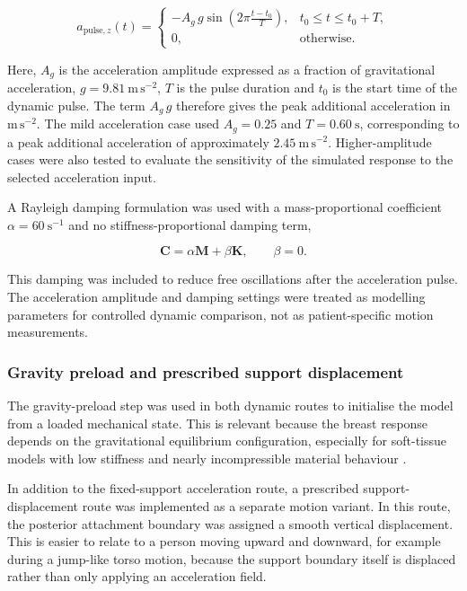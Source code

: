 \begin{equation}
a_{\mathrm{pulse},z}(t)
=
\begin{cases}
-A_{g}\,g\sin\left(2\pi\frac{t-t_{0}}{T}\right), & t_{0} \leq t \leq t_{0}+T, \\
0, & \mathrm{otherwise}.
\end{cases}
\label{fixed_support_acceleration_pulse}
\end{equation}

Here, $A_{g}$ is the acceleration amplitude expressed as a fraction of gravitational acceleration, $g=9.81~\mathrm{m\,s^{-2}}$, $T$ is the pulse duration and $t_{0}$ is the start time of the dynamic pulse. The term $A_{g}\,g$ therefore gives the peak additional acceleration in $\mathrm{m\,s^{-2}}$. The mild acceleration case used $A_{g}=0.25$ and $T=0.60~\mathrm{s}$, corresponding to a peak additional acceleration of approximately $2.45~\mathrm{m\,s^{-2}}$. Higher-amplitude cases were also tested to evaluate the sensitivity of the simulated response to the selected acceleration input.

A Rayleigh damping formulation was used with a mass-proportional coefficient $\alpha=60~\mathrm{s^{-1}}$ and no stiffness-proportional damping term,

\begin{equation}
\mathbf{C}
=
\alpha\mathbf{M}
+
\beta\mathbf{K},
\qquad
\beta=0.
\label{rayleigh_damping_definition}
\end{equation}

This damping was included to reduce free oscillations after the acceleration pulse. The acceleration amplitude and damping settings were treated as modelling parameters for controlled dynamic comparison, not as patient-specific motion measurements.

\subsubsection{Gravity preload and prescribed support displacement}
\label{gravity_preload_and_prescribed_support_displacement}

The gravity-preload step was used in both dynamic routes to initialise the model from a loaded mechanical state. This is relevant because the breast response depends on the gravitational equilibrium configuration, especially for soft-tissue models with low stiffness and nearly incompressible material behaviour \cite{Teixeira2023,Mazier2024}.

In addition to the fixed-support acceleration route, a prescribed support-displacement route was implemented as a separate motion variant. In this route, the posterior attachment boundary was assigned a smooth vertical displacement. This is easier to relate to a person moving upward and downward, for example during a jump-like torso motion, because the support boundary itself is displaced rather than only applying an acceleration field.

